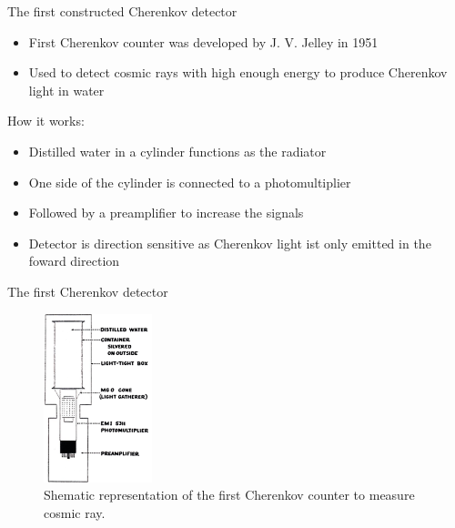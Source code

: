 \documentclass[aspectratio=1610, 10pt]{beamer}
\begin{document}
\begin{frame}{The first constructed Cherenkov detector}
  \begin{itemize}
    \item First Cherenkov counter was developed by J. V. Jelley in 1951
    \medskip
    \item Used to detect cosmic rays with high enough energy to produce Cherenkov light in water
    \medskip \\
  \end{itemize}
\vspace{0.5cm}
How it works:
  \begin{itemize}
    \item Distilled water in a cylinder functions as the radiator
    \medskip
    \item One side of the cylinder is connected to a photomultiplier
    \medskip
    \item Followed by a preamplifier to increase the signals
    \medskip
    \item Detector is direction sensitive as Cherenkov light ist only emitted in the foward direction
  \end{itemize}
\end{frame}

\begin{frame}{The first Cherenkov detector}
  \begin{figure}
    \includegraphics[width=0.28\textwidth]{images/the_first.png}
    \caption{Shematic representation of the first Cherenkov counter to measure cosmic ray.}
  \end{figure}
\end{frame}
\end{document}
